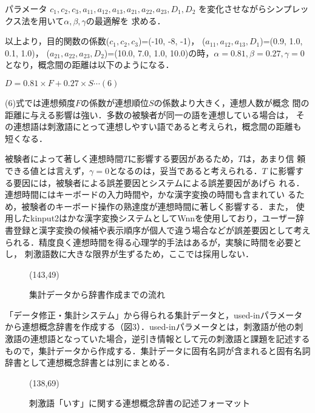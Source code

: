 パラメータ
$c_{1},c_{2},c_{3},a_{11},a_{12},a_{13},a_{21},a_{22},a_{23},D_{1},D_{2}$
を変化させながらシンプレックス法を用いて$\alpha,\beta,\gamma$の最適解を
求める．

以上より，目的関数の係数($c_{1},c_{2},c_{3}$)=(-10, -8, -1)，
($a_{11},a_{12},a_{13},D_{1}$)=(0.9, 1.0, 0.1, 1.0)，
($a_{21},a_{22},a_{23},D_{2}$)=(10.0, 7.0, 1.0, 10.0)の時，$\alpha = 0.81 ,
\beta = 0.27 , \gamma = 0$となり，概念間の距離は以下のようになる．

\begin{center}
$D=0.81 \times F + 0.27 \times S \cdots (6)$

\end{center}


(6)式では連想頻度$F$の係数が連想順位$S$の係数より大きく，連想人数が概念
間の距離に与える影響は強い．多数の被験者が同一の語を連想している場合は，
その連想語は刺激語にとって連想しやすい語であると考えられ，概念間の距離も
短くなる．

被験者によって著しく連想時間$T$に影響する要因があるため，$T$は，あまり信
頼できる値とは言えず，$\gamma=0$となるのは，妥当であると考えられる．$T$
に影響する要因には，被験者による誤差要因とシステムによる誤差要因があげら
れる．連想時間にはキーボードの入力時間や，かな漢字変換の時間も含まれてい
るため，被験者のキーボード操作の熟達度が連想時間に著しく影響する．また，
使用したkinput2はかな漢字変換システムとしてWnnを使用しており，ユーザー辞
書登録と漢字変換の候補や表示順序が個人で違う場合などが誤差要因として考え
られる．精度良く連想時間を得る心理学的手法はあるが，実験に時間を必要とし，
刺激語数に大きな限界が生ずるため，ここでは採用しない．

\bigskip

\begin{figure}[htb]
\begin{center}
\atari(143,49)
\caption{集計データから辞書作成までの流れ}
\end{center}
\end{figure}

「データ修正・集計システム」から得られる集計データと，used-inパラメータ
から連想概念辞書を作成する（図3）．used-inパラメータとは，刺激語が他の刺
激語の連想語となっていた場合，逆引き情報として元の刺激語と課題を記述する
もので，集計データから作成する．集計データに固有名詞が含まれると固有名詞
辞書として連想概念辞書とは別にまとめる．

\begin{figure}[htb]
\begin{center}
\atari(138,69)
\vspace*{1em}
\caption{刺激語「いす」に関する連想概念辞書の記述フォーマット}
\end{center}
\end{figure}

